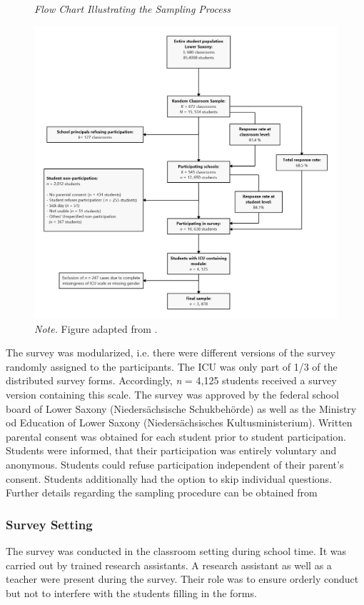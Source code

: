 \documentclass[a4paper,12pt]{article} %
\begin{document}
	\begin{figure}[H]
		\caption{\label{fig:flowchart}\protect\linebreak[1]\textit{Flow Chart Illustrating  the Sampling Process}}
			\centering
		\includegraphics[width=\textwidth]{../figures/flowchart.png}
		\caption*{\textit{Note.} Figure adapted from \parencite{kliem_factor_2019}.}
	\end{figure}

The survey was modularized, i.e. there were different versions of the survey randomly assigned to the participants.
The ICU was only part of 1/3 of the distributed survey forms.
Accordingly, \textit{n} = 4,125 students received a survey version containing this scale.
The survey was approved by the federal school board of Lower Saxony (Nieders\"achsische Schukbeh\"orde) as well as the Ministry od Education of Lower Saxony (Nieders\"achsisches Kultusministerium).
Written parental consent was obtained for each student prior to student participation.
Students were informed, that their participation was entirely voluntary and anonymous.
Students could refuse participation independent of their parent's consent.
Students additionally had the option to skip individual questions.
Further details regarding the sampling procedure can be obtained from \parencite{bergmann_jugendliche_2017}

\subsubsection{Survey Setting}
The survey was conducted in the classroom setting during school time.
It was carried out by trained research assistants.
A research assistant as well as a teacher were present during the survey.
Their role was to ensure orderly conduct but not to interfere with the students filling in the forms.
\end{document}
